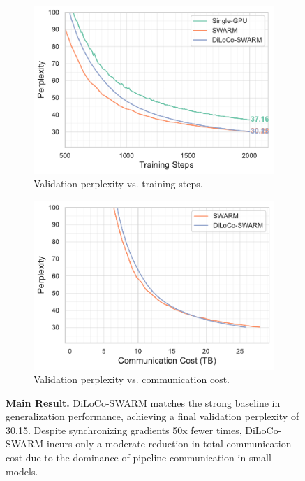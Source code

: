 \documentclass{article}
\begin{document}
\begin{figure}[t]
  \centering
  \begin{subfigure}[b]{0.48\textwidth}
    \centering
    \includegraphics[width=\textwidth]{figures/experiment1-1.pdf}
    \caption{Validation perplexity vs. training steps.}
    \label{fig:experiment1-1}
  \end{subfigure}
  \hfill
  \begin{subfigure}[b]{0.48\textwidth}
    \centering
    \includegraphics[width=\textwidth]{figures/experiment1-2.pdf}
    \caption{Validation perplexity vs. communication cost.}
    \label{fig:experiment1-2}
  \end{subfigure}
  \caption{\textbf{Main Result.} DiLoCo-SWARM matches the strong baseline in generalization performance, achieving a final validation perplexity of 30.15. Despite synchronizing gradients 50x fewer times, DiLoCo-SWARM incurs only a moderate reduction in total communication cost due to the dominance of pipeline communication in small models.}
  \label{fig:experiment1}
\end{figure}
\end{document}
